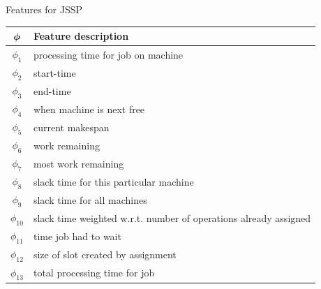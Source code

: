 \documentclass[xcolor=pdftex,t,11pt,handout]{beamer}
\begin{document}
{\begin{block}{Features for JSSP}
\begin{table}[t!]
 {\scriptsize
 \begin{center}
  \begin{tabular}{|c|l|}
   \hline\hline
  ${\boldsymbol{\phi}}$ & Feature description \\ \hline
  $\phi_1$ & processing time for job on machine\\
  $\phi_2$ & start-time \\
  $\phi_3$ & end-time \\
  $\phi_4$ & when machine is next free \\
  $\phi_5$ & current makespan \\
  $\phi_6$ & work remaining \\
  $\phi_7$ & most work remaining \\
  $\phi_8$ & slack time for this particular machine \\
  $\phi_9$ & slack time for all machines \\
  $\phi_{10}$ & slack time weighted w.r.t. number of operations already assigned \\
  $\phi_{11}$ & time job had to wait\\
  $\phi_{12}$ & size of slot created by assignment \\
  $\phi_{13}$ & total processing time for job \\
 \hline\hline
  \end{tabular}
 \end{center}}
\end{table}
\end{block}
}

\end{document}

